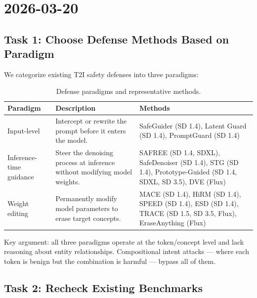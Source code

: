 \documentclass[11pt,a4paper]{article}
\begin{document}
\newpage
\section{2026-03-20}

\subsection{Task 1: Choose Defense Methods Based on Paradigm}

We categorize existing T2I safety defenses into three paradigms:

\begin{table}[h]
\centering
\caption{Defense paradigms and representative methods.}
\renewcommand{\arraystretch}{1.3}
\begin{tabularx}{\textwidth}{@{} p{3cm} p{5cm} X @{}}
\toprule
\textbf{Paradigm} & \textbf{Description} & \textbf{Methods} \\
\midrule
Input-level & Intercept or rewrite the prompt before it enters the model. & SafeGuider \scriptsize{(SD 1.4)}, Latent Guard \scriptsize{(SD 1.4)}, PromptGuard \scriptsize{(SD 1.4)} \\
Inference-time guidance & Steer the denoising process at inference without modifying model weights. & SAFREE \scriptsize{(SD 1.4, SDXL)}, SafeDenoiser \scriptsize{(SD 1.4)}, STG \scriptsize{(SD 1.4)}, Prototype-Guided \scriptsize{(SD 1.4, SDXL, SD 3.5)}, DVE \scriptsize{(Flux)} \\
Weight editing & Permanently modify model parameters to erase target concepts. & MACE \scriptsize{(SD 1.4)}, HiRM \scriptsize{(SD 1.4)}, SPEED \scriptsize{(SD 1.4)}, ESD \scriptsize{(SD 1.4)}, TRACE \scriptsize{(SD 1.5, SD 3.5, Flux)}, EraseAnything \scriptsize{(Flux)} \\
\bottomrule
\end{tabularx}
\label{tab:paradigms}
\end{table}

Key argument: all three paradigms operate at the token/concept level and lack reasoning about entity relationships. Compositional intent attacks --- where each token is benign but the combination is harmful --- bypass all of them.

\subsection{Task 2: Recheck Existing Benchmarks}
\end{document}

